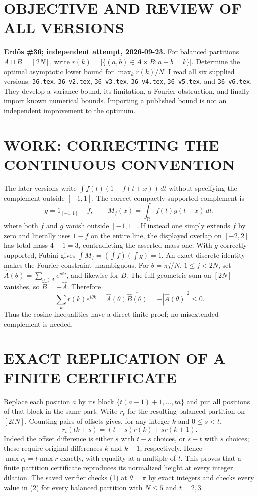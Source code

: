 \section{OBJECTIVE AND REVIEW OF ALL VERSIONS}
\textbf{Erd\H{o}s \#36; independent attempt, 2026-09-23.}
For balanced partitions $A\sqcup B=[2N]$, write $r(k)=|\{(a,b)\in A\times B:a-b=k\}|$. Determine the optimal asymptotic lower bound for $\max_k r(k)/N$. I read all six supplied versions: \texttt{36.tex}, \texttt{36\_v2.tex}, \texttt{36\_v3.tex}, \texttt{36\_v4.tex}, \texttt{36\_v5.tex}, and \texttt{36\_v6.tex}. They develop a variance bound, its limitation, a Fourier obstruction, and finally import known numerical bounds. Importing a published bound is not an independent improvement to the optimum.
\section{WORK: CORRECTING THE CONTINUOUS CONVENTION}
The later versions write $\int f(t)(1-f(t+x))\,dt$ without specifying the complement outside $[-1,1]$. The correct compactly supported complement is
\[
g=1_{[-1,1]}-f,\qquad M_f(x)=\int_{\mathbb R}f(t)g(t+x)\,dt,
\]
where both $f$ and $g$ vanish outside $[-1,1]$. If instead one simply extends $f$ by zero and literally uses $1-f$ on the entire line, the displayed overlap on $[-2,2]$ has total mass $4-1=3$, contradicting the asserted mass one. With $g$ correctly supported, Fubini gives $\int M_f=(\int f)(\int g)=1$.
An exact discrete identity makes the Fourier constraint unambiguous. For $\theta=\pi j/N$, $1\le j<2N$, set $\widehat A(\theta)=\sum_{a\in A}e^{i\theta a}$, and likewise for $B$. The full geometric sum on $[2N]$ vanishes, so $\widehat B=-\widehat A$. Therefore
\[
\sum_k r(k)e^{i\theta k}
=\widehat A(\theta)\overline{\widehat B(\theta)}
=-|\widehat A(\theta)|^2\le0.
\tag{1}
\]
Thus the cosine inequalities have a direct finite proof; no misextended complement is needed.
\section{EXACT REPLICATION OF A FINITE CERTIFICATE}
Replace each position $a$ by its block $\{t(a-1)+1,\ldots,ta\}$ and put all positions of that block in the same part. Write $r_t$ for the resulting balanced partition on $[2tN]$. Counting pairs of offsets gives, for any integer $k$ and $0\le s<t$,
\[
r_t(tk+s)=(t-s)r(k)+sr(k+1).
\tag{2}
\]
Indeed the offset difference is either $s$ with $t-s$ choices, or $s-t$ with $s$ choices; these require original differences $k$ and $k+1$, respectively. Hence $\max r_t=t\max r$ exactly, with equality at a multiple of $t$. This proves that a finite partition certificate reproduces its normalized height at every integer dilation. The saved verifier checks (1) at $\theta=\pi$ by exact integers and checks every value in (2) for every balanced partition with $N\le5$ and $t=2,3$.
